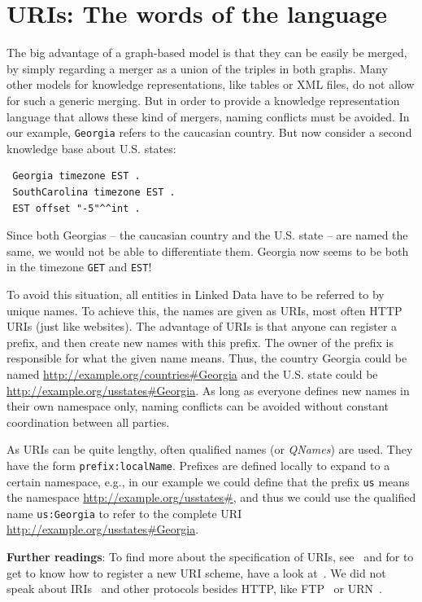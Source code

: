 \section{URIs: The words of the language}
\label{uri}

The big advantage of a graph-based model is that they can be easily be merged, by simply regarding a merger as a union of the triples in both graphs.
Many other models for knowledge representations, like tables or XML files, do not allow for such a generic merging.
But in order to provide a knowledge representation language that allows these kind of mergers, naming conflicts must be avoided.
In our example, \texttt{Georgia} refers to the caucasian country.
But now consider a second knowledge base about U.S. states:

\begin{verbatim}
 Georgia timezone EST .
 SouthCarolina timezone EST .
 EST offset "-5"^^int .
\end{verbatim}

Since both Georgias -- the caucasian country and the U.S. state -- are named the same, we would not be able to differentiate them.
Georgia now seems to be both in the timezone \texttt{GET} and \texttt{EST}!

To avoid this situation, all entities in Linked Data have to be referred to by unique names.
To achieve this, the names are given as URIs, most often HTTP URIs (just like websites).
The advantage of URIs is that anyone can register a prefix, and then create new names with this prefix.
The owner of the prefix is responsible for what the given name means.
Thus, the country Georgia could be named \url{http://example.org/countries\#Georgia} and the U.S. state could be \url{http://example.org/usstates\#Georgia}.
As long as everyone defines new names in their own namespace only, naming conflicts can be avoided without constant coordination between all parties.

As URIs can be quite lengthy, often qualified names (or \textit{QNames}) are used.
They have the form \texttt{prefix:localName}.
Prefixes are defined locally to expand to a certain namespace, e.g., in our example we could define that the prefix \texttt{us} means the namespace \url{http://example.org/usstates\#}, and thus we could use the qualified name \texttt{us:Georgia} to refer to the complete URI \url{http://example.org/usstates\#Georgia}.

\medskip

\textbf{Further readings}:
To find more about the specification of URIs, see~\cite{uri} and for to get to know how to register a new URI scheme, have a look at~\cite{uri-registration}.
We did not speak about IRIs~\cite{iri} and other protocols besides HTTP, like FTP~\cite{ftp} or URN~\cite{urn}.

